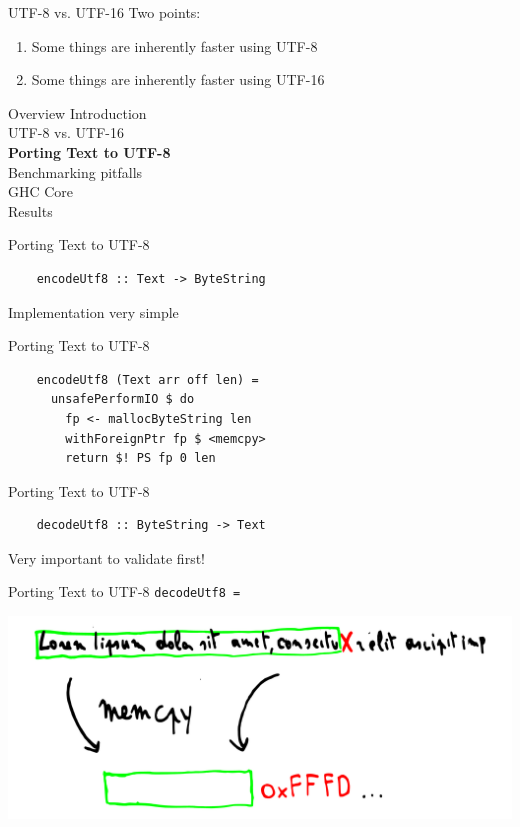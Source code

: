 \documentclass[20pt]{beamer}
\newcommand{\vspaced}{
    \vspace{5mm}
}
\begin{document}
\begin{frame}{UTF-8 vs. UTF-16}
    Two points:
    \begin{enumerate}
    \item Some things are inherently faster using UTF-8
    \item Some things are inherently faster using UTF-16
    \end{enumerate}
\end{frame}


\begin{frame}{Overview}
    Introduction \\
    UTF-8 vs. UTF-16 \\
    \textbf{Porting Text to UTF-8} \\
    Benchmarking pitfalls \\
    GHC Core \\
    Results
\end{frame}

\begin{frame}[fragile]{Porting Text to UTF-8}
    \begin{lstlisting}
    encodeUtf8 :: Text -> ByteString
    \end{lstlisting}
    \vspaced
    Implementation very simple
\end{frame}

\begin{frame}[fragile]{Porting Text to UTF-8}
    \begin{lstlisting}
    encodeUtf8 (Text arr off len) =
      unsafePerformIO $ do
        fp <- mallocByteString len
        withForeignPtr fp $ <memcpy>
        return $! PS fp 0 len
    \end{lstlisting}
\end{frame}

\begin{frame}[fragile]{Porting Text to UTF-8}
    \begin{lstlisting}
    decodeUtf8 :: ByteString -> Text
    \end{lstlisting}
    \vspaced
    Very important to validate first!
\end{frame}

\begin{frame}{Porting Text to UTF-8}
    \texttt{decodeUtf8 =}
    \vspaced
    \begin{center}
    \includegraphics[width=\textwidth]{images/decode.pdf}
    \end{center}
\end{frame}
\end{document}
